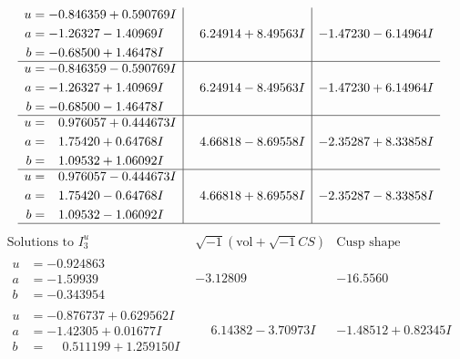 \documentclass[1p]{elsarticle_modified}
\theoremstyle{definition}
\newcommand{\I}{\sqrt{-1}}
\begin{document}
$$\begin{array}{c|c|c}
\begin{aligned}
u &= -0.846359 + 0.590769 I \\
a &= -1.26327 - 1.40969 I \\
b &= -0.68500 + 1.46478 I\end{aligned}
 & \phantom{-}6.24914 + 8.49563 I & -1.47230 - 6.14964 I \\ \hline\begin{aligned}
u &= -0.846359 - 0.590769 I \\
a &= -1.26327 + 1.40969 I \\
b &= -0.68500 - 1.46478 I\end{aligned}
 & \phantom{-}6.24914 - 8.49563 I & -1.47230 + 6.14964 I \\ \hline\begin{aligned}
u &= \phantom{-}0.976057 + 0.444673 I \\
a &= \phantom{-}1.75420 + 0.64768 I \\
b &= \phantom{-}1.09532 + 1.06092 I\end{aligned}
 & \phantom{-}4.66818 - 8.69558 I & -2.35287 + 8.33858 I \\ \hline\begin{aligned}
u &= \phantom{-}0.976057 - 0.444673 I \\
a &= \phantom{-}1.75420 - 0.64768 I \\
b &= \phantom{-}1.09532 - 1.06092 I\end{aligned}
 & \phantom{-}4.66818 + 8.69558 I & -2.35287 - 8.33858 I\\
 \hline 
 \end{array}$$\newpage$$\begin{array}{c|c|c}  
\text{Solutions to }I^u_{3}& \I (\text{vol} + \sqrt{-1}CS) & \text{Cusp shape}\\
 \hline 
\begin{aligned}
u &= -0.924863\phantom{ +0.000000I} \\
a &= -1.59939\phantom{ +0.000000I} \\
b &= -0.343954\phantom{ +0.000000I}\end{aligned}
 & -3.12809\phantom{ +0.000000I} & -16.5560\phantom{ +0.000000I} \\ \hline\begin{aligned}
u &= -0.876737 + 0.629562 I \\
a &= -1.42305 + 0.01677 I \\
b &= \phantom{-}0.511199 + 1.259150 I\end{aligned}
 & \phantom{-}6.14382 - 3.70973 I & -1.48512 + 0.82345 I \\ \hline\begin{aligned}

\end{aligned}
\end{array}$$
\end{document}
